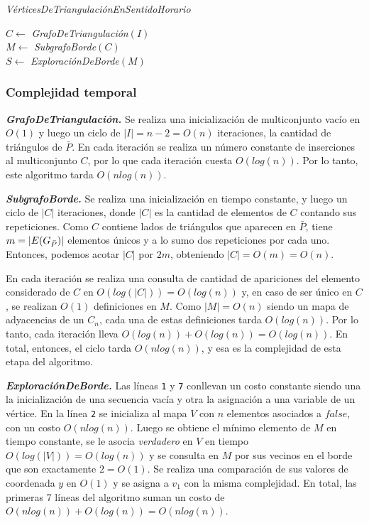 \bigskip 

\begin{algorithm}[H]
	\caption{\textit{VérticesDeTriangulaciónEnSentidoHorario}}

	$C \gets$ \textit{GrafoDeTriangulación}$(I)$ \\
	$M \gets$ \textit{SubgrafoBorde}$(C)$ \\
	$S \gets$ \textit{ExploraciónDeBorde}$(M)$ \\
	
\end{algorithm}

\subsubsection{Complejidad temporal}

\textit{\textbf{GrafoDeTriangulación.}} Se realiza una inicialización de multiconjunto vacío en $O(1)$ y luego un ciclo de $|I| = n-2 = O(n)$ iteraciones, la cantidad de triángulos de $\bar{P}$. En cada iteración se realiza un número constante de inserciones al multiconjunto $C$, por lo que cada iteración cuesta $O(log(n))$. Por lo tanto, este algoritmo tarda $O(n log(n))$.

\medskip

\textit{\textbf{SubgrafoBorde.}} Se realiza una inicialización en tiempo constante, y luego un ciclo de $|C|$ iteraciones, donde $|C|$ es la cantidad de elementos de $C$ contando sus repeticiones. Como $C$ contiene lados de triángulos que aparecen en $\bar{P}$, tiene $m = |E(G_{\bar{P}})|$ elementos únicos y a lo sumo dos repeticiones por cada uno. Entonces, podemos acotar $|C|$ por $2m$, obteniendo $|C| = O(m) = O(n)$.

En cada iteración se realiza una consulta de cantidad de apariciones del elemento considerado de $C$ en $O(log(|C|)) = O(log(n))$ y, en caso de ser único en $C$, se realizan $O(1)$ definiciones en $M$. Como $|M| = O(n)$ siendo un mapa de adyacencias de un $C_n$, cada una de estas definiciones tarda $O(log(n))$. Por lo tanto, cada iteración lleva $O(log(n)) + O(log(n)) = O(log(n))$. En total, entonces, el ciclo tarda $O(n log(n))$, y esa es la complejidad de esta etapa del algoritmo.

\medskip

\textit{\textbf{ExploraciónDeBorde.}} Las líneas \texttt{1} y \texttt{7} conllevan un costo constante siendo una la inicialización de una secuencia vacía y otra la asignación a una variable de un vértice. En la línea \texttt{2} se inicializa al mapa $V$ con $n$ elementos asociados a $false$, con un costo $O(n log (n))$. Luego se obtiene el mínimo elemento de $M$ en tiempo constante, se le asocia \textit{verdadero} en $V$ en tiempo $O(log(|V|)) = O(log(n))$ y se consulta en $M$ por sus vecinos en el borde que son exactamente $2 = O(1)$. Se realiza una comparación de sus valores de coordenada $y$ en $O(1)$ y se asigna a $v_1$ con la misma complejidad. En total, las primeras 7 líneas del algoritmo suman un costo de $O(n log(n)) + O(log(n)) = O(n log(n))$.

